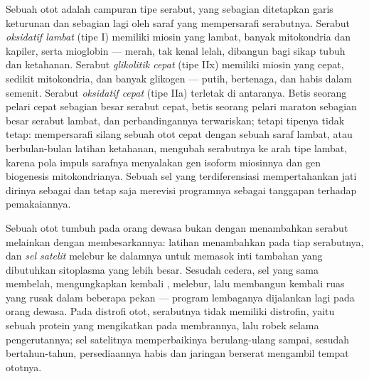 \begin{proposition}\label{prop:b2:cell-differentiation:types}
Sebuah otot adalah campuran tipe serabut, yang sebagian ditetapkan
garis keturunan  dan sebagian lagi oleh saraf yang
mempersarafi serabutnya. Serabut \emph{oksidatif lambat} (tipe I)
memiliki miosin yang lambat, banyak mitokondria dan kapiler, serta
mioglobin --- merah, tak kenal lelah, dibangun bagi sikap tubuh dan
ketahanan. Serabut \emph{glikolitik cepat} (tipe IIx) memiliki miosin
yang cepat, sedikit mitokondria, dan banyak glikogen --- putih,
bertenaga, dan habis dalam semenit. Serabut \emph{oksidatif cepat}
(tipe IIa) terletak di antaranya. Betis seorang pelari cepat sebagian
besar serabut cepat, betis seorang pelari maraton sebagian besar
serabut lambat, dan perbandingannya terwariskan; tetapi tipenya tidak
tetap: mempersarafi silang sebuah otot cepat dengan sebuah saraf
lambat, atau berbulan-bulan latihan ketahanan, mengubah serabutnya ke
arah tipe lambat, karena pola impuls sarafnya menyalakan gen isoform
miosinnya dan gen biogenesis mitokondrianya. Sebuah sel yang
terdiferensiasi mempertahankan jati dirinya sebagai  dan
tetap saja merevisi programnya sebagai tanggapan terhadap pemakaiannya.
\end{proposition}

\begin{example}\label{ex:b2:cell-differentiation:satellite}
Sebuah otot tumbuh pada orang dewasa bukan dengan menambahkan serabut
melainkan dengan membesarkannya: latihan menambahkan  pada
tiap serabutnya, dan \emph{sel satelit} melebur ke dalamnya untuk
memasok inti tambahan yang dibutuhkan sitoplasma yang lebih besar.
Sesudah cedera, sel yang sama membelah, mengungkapkan kembali ,
melebur, lalu membangun kembali ruas yang rusak dalam beberapa pekan
--- program lembaganya dijalankan lagi pada orang dewasa. Pada distrofi
otot, serabutnya tidak memiliki distrofin, yaitu sebuah protein yang
mengikatkan  pada membrannya, lalu robek selama
pengerutannya; sel satelitnya memperbaikinya berulang-ulang sampai,
sesudah bertahun-tahun, persediaannya habis dan jaringan berserat
mengambil tempat ototnya.
\end{example}

